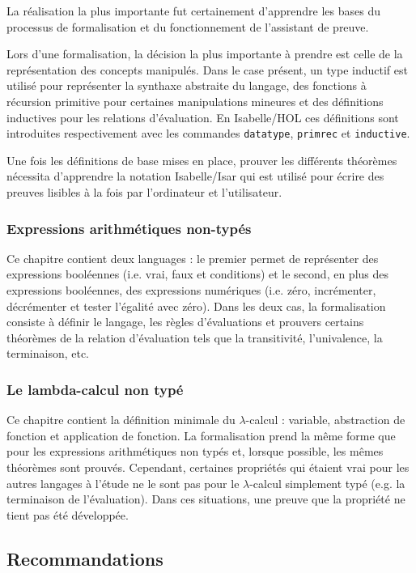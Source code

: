 \documentclass[a4paper, oneside, 12pt, titlepage]{article}
\begin{document}
La réalisation la plus importante fut certainement d'apprendre les bases du processus de
formalisation et du fonctionnement de l'assistant de preuve.

Lors d'une formalisation, la décision la plus importante à prendre est celle de la représentation
des concepts manipulés. Dans le case présent, un type inductif est utilisé pour représenter la
synthaxe abstraite du langage, des fonctions à récursion primitive pour certaines manipulations
mineures et des définitions inductives pour les relations d'évaluation. En Isabelle/HOL ces
définitions sont introduites respectivement avec les commandes \texttt{datatype}, \texttt{primrec}
et \texttt{inductive}.

Une fois les définitions de base mises en place, prouver les différents théorèmes nécessita
d'apprendre la notation Isabelle/Isar qui est utilisé pour écrire des preuves lisibles à la fois par
l'ordinateur et l'utilisateur.

\subsubsection{Expressions arithmétiques non-typés}

Ce chapitre contient deux languages : le premier permet de représenter des expressions booléennes
(i.e. vrai, faux et conditions) et le second, en plus des expressions booléennes, des expressions
numériques (i.e. zéro, incrémenter, décrémenter et tester l'égalité avec zéro). Dans les deux cas,
la formalisation consiste à définir le langage, les règles d'évaluations et prouvers certains
théorèmes de la relation d'évaluation tels que la transitivité, l'univalence, la terminaison, etc.

\subsubsection{Le lambda-calcul non typé}

Ce chapitre contient la définition minimale du $\lambda$-calcul : variable, abstraction de fonction
et application de fonction. La formalisation prend la même forme que pour les expressions
arithmétiques non typés et, lorsque possible, les mêmes théorèmes sont prouvés. Cependant, certaines
propriétés qui étaient vrai pour les autres langages à l'étude ne le sont pas pour le
$\lambda$-calcul simplement typé (e.g. la terminaison de l'évaluation). Dans ces situations, une
preuve que la propriété ne tient pas été développée.

\subsection{Recommandations}
\end{document}
